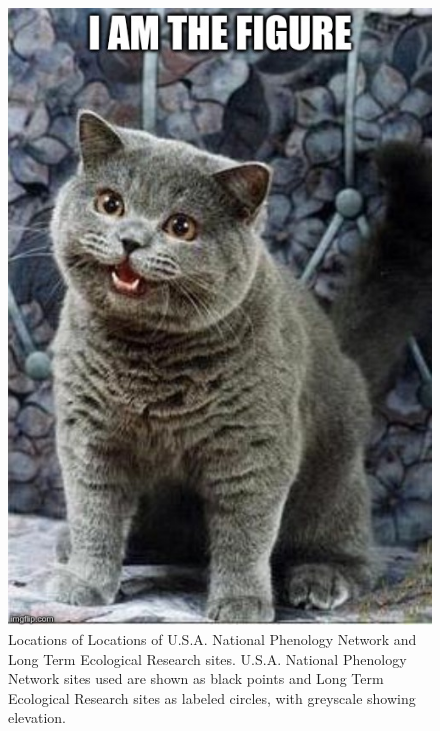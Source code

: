 \newpage


\begin{figure}
	\centering
	\includegraphics[scale=0.3]{images/figure_filler.jpg}
	\caption[Locations of Locations of U.S.A. National Phenology Network and Long Term Ecological Research sites]{Locations of Locations of U.S.A. National Phenology Network and Long Term Ecological Research sites. U.S.A. National Phenology Network sites used are shown as black points and Long Term Ecological Research sites as labeled circles, with greyscale showing elevation.} \label{fig-2-1}
\end{figure}

